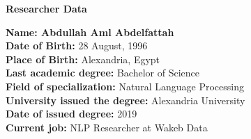 \cleardoublepage
\newpage
\thispagestyle{empty}

\begin{center}\huge \textbf{Researcher Data}\end{center}
\vspace{3em}
\begin{flushleft}
\textbf{Name: Abdullah Aml Abdelfattah} \\

\textbf{Date of Birth:} 28 August, 1996 \\

\textbf{Place of Birth:} Alexandria, Egypt \\

\textbf{Last academic degree:} Bachelor of Science \\

\textbf{Field of specialization:} Natural Language Processing \\

\textbf{University issued the degree:} Alexandria University \\

\textbf{Date of issued degree:} 2019 \\


\textbf{Current job:} NLP Researcher at Wakeb Data \\

\end{flushleft}
\vfill






